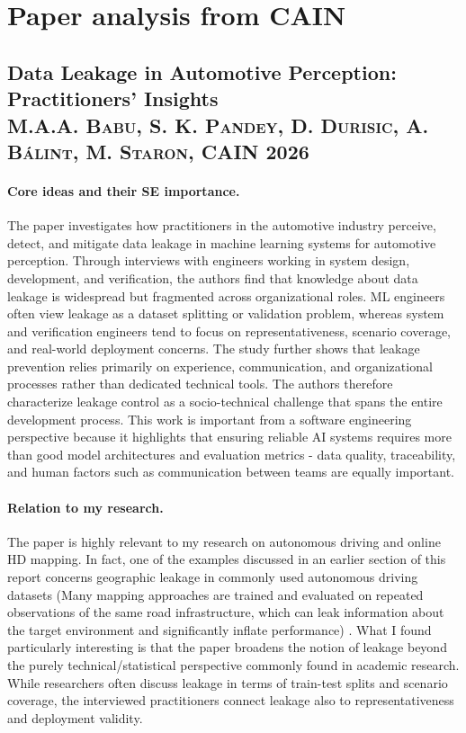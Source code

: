 \documentclass[11pt]{article}
\begin{document}
\section{Paper analysis from CAIN}

\subsection{Data Leakage in Automotive Perception: Practitioners' Insights\\\small \textsc{M.A.A. Babu, S. K. Pandey, D. Durisic, A. B\'alint, M. Staron}, CAIN 2026}
\paragraph{Core ideas and their SE importance.}
The paper investigates how practitioners in the automotive industry perceive, detect, and mitigate data leakage in machine learning systems for automotive perception. Through interviews with engineers working in system design, development, and verification, the authors find that knowledge about data leakage is widespread but fragmented across organizational roles. ML engineers often view leakage as a dataset splitting or validation problem, whereas system and verification engineers tend to focus on representativeness, scenario coverage, and real-world deployment concerns. The study further shows that leakage prevention relies primarily on experience, communication, and organizational processes rather than dedicated technical tools. The authors therefore characterize leakage control as a socio-technical challenge that spans the entire development process. This work is important from a software engineering perspective because it highlights that ensuring reliable AI systems requires more than good model architectures and evaluation metrics - data quality, traceability, and human factors such as communication between teams are equally important. 

\paragraph{Relation to my research.} The paper is highly relevant to my research on autonomous driving and online HD mapping. In fact, one of the examples discussed in an earlier section of this report concerns geographic leakage in commonly used autonomous driving datasets (Many mapping approaches are trained and evaluated on repeated observations of the same road infrastructure, which can leak information about the target environment and significantly inflate performance) \cite{lilja, streammapnet}. What I found particularly interesting is that the paper broadens the notion of leakage beyond the purely technical/statistical perspective commonly found in academic research. While researchers often discuss leakage in terms of train-test splits and scenario coverage, the interviewed practitioners connect leakage also to representativeness and deployment validity. 
\end{document}
